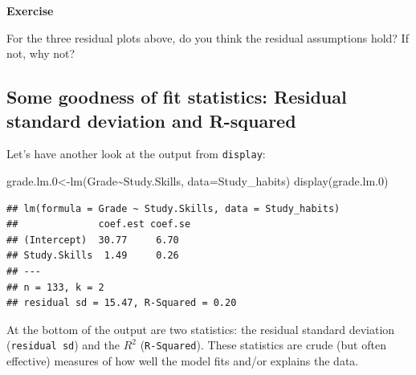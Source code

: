 \documentclass[
]{gitbook}
\newenvironment{Shaded}{\begin{snugshade}}{\end{snugshade}}
\newcommand{\AttributeTok}[1]{\textcolor[rgb]{0.77,0.63,0.00}{#1}}
\newcommand{\FloatTok}[1]{\textcolor[rgb]{0.00,0.00,0.81}{#1}}
\newcommand{\FunctionTok}[1]{\textcolor[rgb]{0.00,0.00,0.00}{#1}}
\newcommand{\NormalTok}[1]{#1}
\newcommand{\OtherTok}[1]{\textcolor[rgb]{0.56,0.35,0.01}{#1}}
\newcommand{\SpecialCharTok}[1]{\textcolor[rgb]{0.00,0.00,0.00}{#1}}
\begin{document}
\textbf{Exercise}

For the three residual plots above, do you think the residual assumptions hold? If not, why not?


\hypertarget{some-goodness-of-fit-statistics-residual-standard-deviation-and-r-squared}{%
\subsection{Some goodness of fit statistics: Residual standard deviation and R-squared}\label{some-goodness-of-fit-statistics-residual-standard-deviation-and-r-squared}}

Let's have another look at the output from \texttt{display}:

\begin{Shaded}
\begin{Highlighting}[]
\NormalTok{grade.lm}\FloatTok{.0}\OtherTok{\textless{}{-}}\FunctionTok{lm}\NormalTok{(Grade}\SpecialCharTok{\textasciitilde{}}\NormalTok{Study.Skills, }\AttributeTok{data=}\NormalTok{Study\_habits)}
\FunctionTok{display}\NormalTok{(grade.lm}\FloatTok{.0}\NormalTok{)}
\end{Highlighting}
\end{Shaded}

\begin{verbatim}
## lm(formula = Grade ~ Study.Skills, data = Study_habits)
##              coef.est coef.se
## (Intercept)  30.77     6.70  
## Study.Skills  1.49     0.26  
## ---
## n = 133, k = 2
## residual sd = 15.47, R-Squared = 0.20
\end{verbatim}

At the bottom of the output are two statistics: the residual standard deviation (\texttt{residual\ sd}) and the \(R^2\) (\texttt{R-Squared}). These statistics are crude (but often effective) measures of how well the model fits and/or explains the data.
\end{document}
